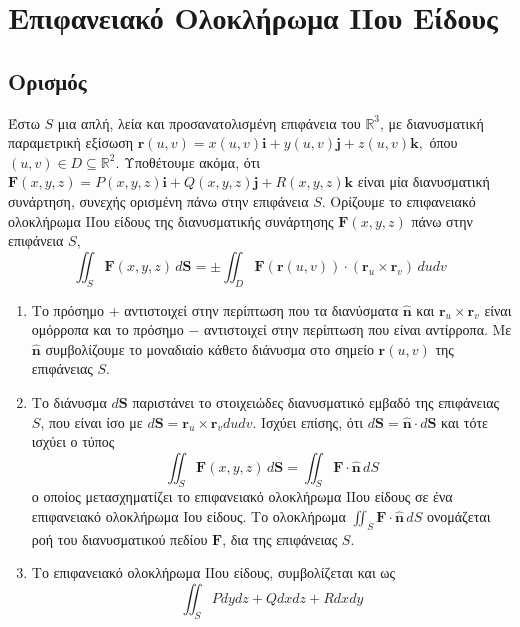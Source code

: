 







\chapter*{Επιφανειακό Ολοκλήρωμα ΙΙου Είδους}

\setcounter{chapter}{1}

\section{Ορισμός}

Έστω $ S $ μια απλή, λεία και προσανατολισμένη επιφάνεια του $ \mathbb{R}^{3} $, 
με διανυσματική παραμετρική εξίσωση $ \mathbf{r}(u,v) =
x(u,v)\mathbf{i}+y(u,v)\mathbf{j}+z(u,v)\mathbf{k}, $ όπου $ (u,v) \in D \subseteq
\mathbb{R}^{2} $. Υποθέτουμε ακόμα, ότι $ \mathbf{F}(x,y,z) =
P(x,y,z)\mathbf{i}+Q(x,y,z)\mathbf{j}+R(x,y,z)\mathbf{k} $ είναι μία διανυσματική 
συνάρτηση, συνεχής ορισμένη πάνω στην επιφάνεια $S$. Ορίζουμε το 
\textcolor{Col1}{επιφανειακό ολοκλήρωμα ΙΙου είδους} της διανυσματικής συνάρτησης 
$ \mathbf{F}(x,y,z) $ πάνω στην επιφάνεια $S$,
\[
  \iint_{S} \mathbf{F}(x,y,z) \, d \mathbf{S}  = \pm \iint_{D} \mathbf{F}(\mathbf{r}(u,v))
  \cdot (\mathbf{r}_{u} \times \mathbf{r}_{v}) \, dudv   
\]

\begin{rems}
\item {}
  \begin{enumerate}
    \item Το πρόσημο $ + $ αντιστοιχεί στην περίπτωση που τα διανύσματα 
      $ \mathbf{\widehat{n}} $ και $ \mathbf{r}_{u} \times \mathbf{r}_{v} $ 
      είναι ομόρροπα και το πρόσημο $ - $ αντιστοιχεί στην περίπτωση που είναι 
      αντίρροπα. Με $ \mathbf{\widehat{n}} $ συμβολίζουμε το μοναδιαίο κάθετο διάνυσμα 
      στο σημείο $ \mathbf{r}(u,v) $ της επιφάνειας $S$.
    \item Το διάνυσμα $ d \mathbf{S} $ παριστάνει το στοιχειώδες διανυσματικό εμβαδό 
      της επιφάνειας $S$, που είναι ίσο με $ d \mathbf{S} = \mathbf{r}_{u} \times
      \mathbf{r}_{v} du dv $. Ισχύει επίσης, ότι $ d \mathbf{S} = \mathbf{\widehat{n}}
      \cdot d \mathbf{S} $ και τότε ισχύει ο τύπος 
      \[
        \iint_{S} \mathbf{F}(x,y,z) \, d \mathbf{S} = \iint_{S} \mathbf{F} \cdot
        \mathbf{\widehat{n}} \,{dS}
      \] 
      ο οποίος μετασχηματίζει το επιφανειακό ολοκλήρωμα ΙΙου είδους σε ένα επιφανειακό 
      ολοκλήρωμα Ιου είδους. Το ολοκλήρωμα $ \iint_{S} \mathbf{F}\cdot
      \mathbf{\widehat{n}} \,{dS} $ ονομάζεται \textcolor{Col1}{ροή} του 
      διανυσματικού πεδίου $ \mathbf{F} $, δια της επιφάνειας $S$.
    \item Το επιφανειακό ολοκλήρωμα ΙΙου είδους, συμβολίζεται και ως 
      \[
        \iint_{S} Pdydz + Qdxdz + Rdxdy 
      \] 
  \end{enumerate}
\end{rems} 

